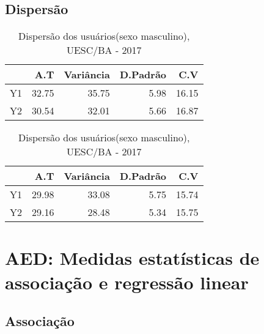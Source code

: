 \documentclass[a4paper, 10pt]{article}
\begin{document}
		\subsection{Dispersão}
			\begin{table}[!htb]
				\caption{Dispersão  dos usuários(sexo masculino), UESC/BA - 2017}
				\begin{tabular}{crrrr}
					\hline
					& A.T & Variância & D.Padrão & C.V \\
					\hline
					Y1 & 32.75 & 35.75 & 5.98 & 16.15 \\
					Y2 & 30.54 & 32.01 & 5.66 & 16.87 \\
					\hline
				\end{tabular}
			\end{table}
			\begin{table}[!htb]
				\caption{Dispersão  dos usuários(sexo masculino), UESC/BA - 2017}
				\begin{tabular}{crrrr}
					\hline
					& A.T & Variância & D.Padrão & C.V \\
					\hline
					Y1 & 29.98 & 33.08 & 5.75 & 15.74 \\
					Y2 & 29.16 & 28.48 & 5.34 & 15.75 \\
					\hline
				\end{tabular}
			\end{table}
	\section{AED: Medidas estatísticas de associação e regressão linear}
		\subsection{Associação}
\end{document}
